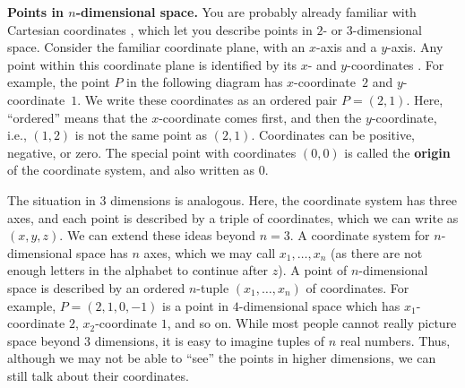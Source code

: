 \noindent\textbf{Points in $n$-dimensional space.}
You are probably already familiar with Cartesian coordinates%
%
, which let you describe points%
 in $2$- or $3$-dimensional space. Consider the familiar
coordinate plane, with an $x$-axis and a $y$-axis. Any point within
this coordinate plane is identified by its $x$- and $y$-coordinates%
. For example, the point $P$ in the
following diagram has $x$-coordinate~$2$ and $y$-coordinate~$1$.  We
write these coordinates as an ordered pair $P=(2,1)$. Here,
``ordered'' means that the $x$-coordinate comes first, and then the
$y$-coordinate, i.e., $(1,2)$ is not the same point as
$(2,1)$. Coordinates can be positive, negative, or zero. The special
point with coordinates $(0,0)$ is called the \textbf{origin}%
 of the coordinate system, and
also written as $0$.
\begin{center}
\end{center}
The situation in $3$ dimensions is analogous. Here, the coordinate
system has three axes, and each point is described by a triple of
coordinates, which we can write as $(x,y,z)$.  We can extend these
ideas beyond $n=3$. A coordinate system for $n$-dimensional space has
$n$ axes, which we may call $x_1,\ldots,x_n$ (as there are not enough
letters in the alphabet to continue after $z$). A point of
$n$-dimensional space is described by an ordered $n$-tuple
$(x_1,\ldots,x_n)$ of coordinates. For example, $P=(2,1,0,-1)$ is a
point in $4$-dimensional space which has $x_1$-coordinate $2$,
$x_2$-coordinate $1$, and so on. While most people cannot really
picture space beyond $3$ dimensions, it is easy to imagine tuples of
$n$ real numbers. Thus, although we may not be able to ``see'' the
points in higher dimensions, we can still talk about their coordinates.
\bigskip

